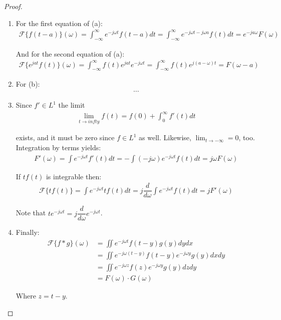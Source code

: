 \begin{proof}
\begin{enumerate}[label=(\alph*)]
\item
For the first equation of (a):
\begin{align*}
\mathcal{F}\{f(t-a)\}(\omega) = \int_{-\infty}^\infty e^{-j\omega t} f(t - a) dt = \int_{-\infty}^\infty e^{-j\omega t - j\omega a} f(t) dt = e^{-ja \omega} F(\omega)
\end{align*}

And for the second equation of (a):
\begin{align*}
\mathcal{F}\{e^{jat} f(t)\}(\omega) = \int_{-\infty}^\infty f(t) e^{jat} e^{-j \omega t} = \int_{-\infty}^\infty f(t) e^{j(a- \omega)t} = F(\omega - a)
\end{align*}

\item For (b):
\begin{align*}
\dots
\end{align*}

\item Since $f' \in L^1$ the limit
\begin{align*}
\lim_{t \to infty} f(t) = f(0) + \int_0^\infty f'(t) dt
\end{align*}

exists, and it must be zero since $f \in L^1$ as well. Likewise, $\lim_{t \to -\infty} = 0$, too. Integration by terms yields:
\begin{align*}
F'(\omega) = \int e^{-j \omega t} f'(t) dt = - \int (-j \omega) e^{-j \omega t} f(t) dt = j\omega F(\omega)
\end{align*}

If $tf(t)$ is integrable then:
\begin{align*}
\mathcal{F}\{tf(t)\} = \int e^{-j \omega t} t f(t) dt = j \dfrac{d}{d\omega} \int e^{-j \omega t} f(t) dt = j F'(\omega)
\end{align*}

Note that $t e^{-j \omega t} = j \dfrac{d}{d\omega} e^{-j\omega t}$.

\item Finally:
\begin{align*}
\mathcal{F}\{f*g\}(\omega) &= \iint e^{-j \omega t} f(t - y) g(y) dy dx \\
&= \iint e^{-j\omega(t-y)} f(t-y) e^{-j\omega y} g(y) dx dy \\
&= \iint e^{-j\omega z} f(z) e^{-j\omega y} g(y) dz dy \\
&= F(\omega) \cdot G(\omega)
\end{align*}

Where $z = t - y$.
\end{enumerate}
\end{proof}


